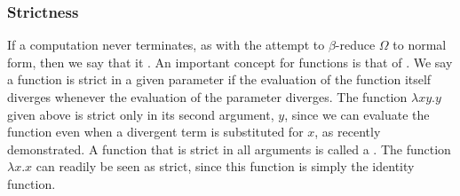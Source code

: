 \subsubsection{Strictness}\label{untyped:strictness}
If a computation never terminates, as with the attempt to $\beta$-reduce $\Omega$ to normal form, then we say that it . An important concept for functions is that of . We say a function is strict in a given parameter if the evaluation of the function itself diverges whenever the evaluation of the parameter diverges. The function $\lambda x y. y$ given above is strict only in its second argument, $y$, since we can evaluate the function even when a divergent term is substituted for $x$, as recently demonstrated. A function that is strict in all arguments is called a . The function $\lambda x. x$ can readily be seen as strict, since this function is simply the identity function.
